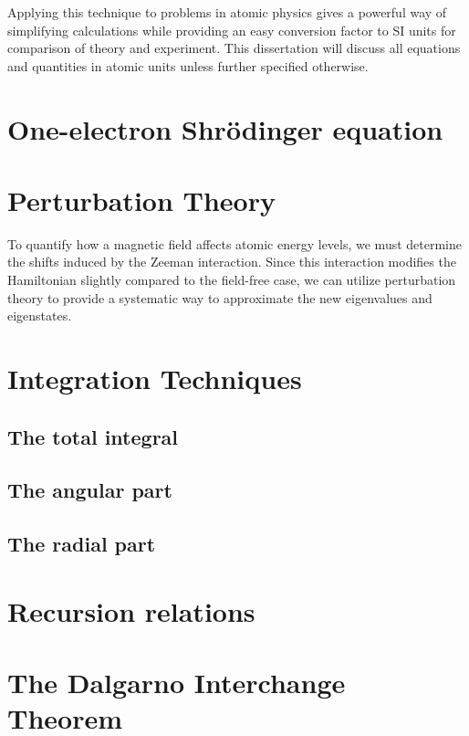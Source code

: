         Applying this technique to problems in atomic physics gives a powerful way of simplifying calculations while providing an easy conversion factor to SI units for comparison of theory and experiment. This dissertation will discuss all equations and quantities in atomic units unless further specified otherwise.


    \section{One-electron Shrödinger equation} \label{sec:Schrodinger_Equation}
    \section{Perturbation Theory} \label{sec:Perturbation_Theory}
        To quantify how a magnetic field affects atomic energy levels, we must determine the shifts induced by the Zeeman interaction. Since this interaction modifies the Hamiltonian slightly compared to the field-free case, we can utilize perturbation theory to provide a systematic way to approximate the new eigenvalues and eigenstates.
    \section{Integration Techniques} \label{sec:Integration_Techniques}
        \subsection{The total integral} \label{sec:The_Total_Integral}
        \subsection{The angular part} \label{sec:The_Angular_Part}
        \subsection{The radial part} \label{sec:The_Radial_Part}
    \section{Recursion relations} \label{sec:Recursion_Relations}
    \section{The Dalgarno Interchange Theorem} \label{sec:Dalgarno_Interchange_Theorem}
    
    